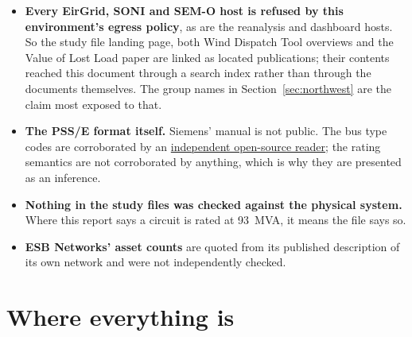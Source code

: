 \documentclass[11pt,a4paper]{article}
\begin{document}
\begin{itemize}
\item \textbf{Every EirGrid, SONI and SEM-O host is refused by this
      environment's egress policy}, as are the reanalysis and dashboard hosts.
      So the study file landing page, both Wind Dispatch Tool overviews and the
      Value of Lost Load paper are linked as located publications; their
      contents reached this document through a search index rather than through
      the documents themselves. The group names in Section~\ref{sec:northwest}
      are the claim most exposed to that.
\item \textbf{The PSS/E format itself.} Siemens' manual is not public. The bus
      type codes are corroborated by an \href{https://powsybl.readthedocs.io/projects/powsybl-core/en/latest/grid_exchange_formats/psse/}{independent open-source reader};
      the rating semantics are not corroborated by anything, which is why they
      are presented as an inference.
\item \textbf{Nothing in the study files was checked against the physical
      system.} Where this report says a circuit is rated at 93~MVA, it means
      the file says so.
\item \textbf{ESB Networks' asset counts} are quoted from its published
      description of its own network and were not independently checked.
\end{itemize}

\clearpage
\section{Where everything is}
\end{document}
